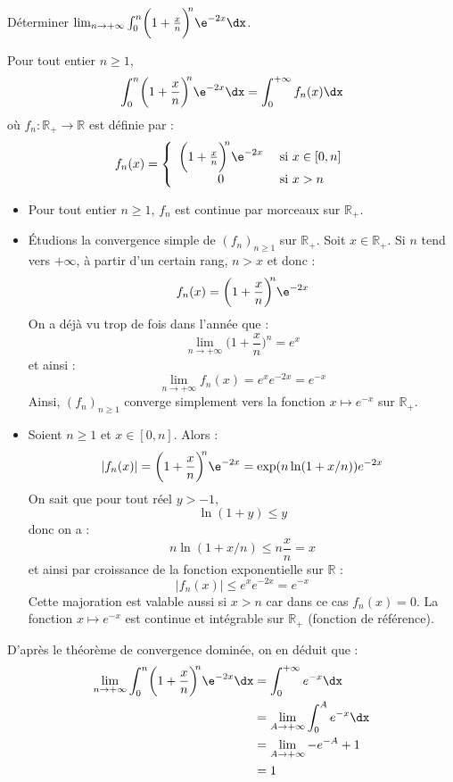 \documentclass[a4paper,10pt]{report}
\begin{document}
\begin{Exercice}{} Déterminer $\lim_{n \to + \infty} \int_{0}^{n} \biggl( 1 + \frac{x}{n} \biggr)^{\!\!n} \e^{ - 2x} \dx$.
\end{Exercice}

\corr Pour tout entier $n \geq 1$,
$$ \int_{0}^{n} \biggl( 1 + \frac{x}{n} \biggr)^{\!\!n} \e^{ - 2x} \dx = \int_0^{+ \infty} f_n(x) \dx$$
où $f_n : \mathbb{R}_+ \rightarrow  \mathbb{R}$ est définie par :
$$ f_n(x) = \left\lbrace \begin{array}{cl}
\biggl( 1 + \frac{x}{n} \biggr)^{\!\!n} \e^{ - 2x} & \hbox{ si } x \in [0,n] \\
0 & \hbox{ si } x>n
\end{array}\right.$$
\begin{itemize}
\item Pour tout entier $n \geq 1$, $f_n$ est continue par morceaux sur $\mathbb{R}_+$.
\item Étudions la convergence simple de $(f_n)_{n \geq 1}$ sur $\mathbb{R}_+$. Soit $x \in \mathbb{R}_+$. Si $n$ tend vers $+ \infty$, à partir d'un certain rang, $n>x$ et donc :
$$ f_n(x) = \biggl( 1 + \frac{x}{n} \biggr)^{\!\!n} \e^{ - 2x}$$
On a déjà vu trop de fois dans l'année que :
$$ \lim_{n \rightarrow + \infty} \biggl( 1 + \frac{x}{n} \biggr)^{\!\!n} = e^x$$
et ainsi :
$$ \lim_{n \rightarrow + \infty} f_n(x) =e^x e^{-2x} = e^{-x}$$
Ainsi, $(f_n)_{n \geq 1}$ converge simplement vers la fonction $x \mapsto e^{-x}$ sur $\mathbb{R}_+$.
\item Soient $n \geq 1$ et $x \in [0,n]$. Alors :
$$ \vert f_n(x) \vert = \biggl( 1 + \frac{x}{n} \biggr)^{\!\!n} \e^{ - 2x} = \exp(n \ln(1+x/n)) e^{-2x}$$
On sait que pour tout réel $y>-1$,
$$ \ln(1+y) \leq y$$
donc on a :
$$ n \ln(1+x/n) \leq n\dfrac{x}{n} = x$$
et ainsi par croissance de la fonction exponentielle sur $\mathbb{R}$ :
$$ \vert f_n(x) \vert  \leq e^{x} e^{-2x} = e^{-x}$$
Cette majoration est valable aussi si $x>n$ car dans ce cas $f_n(x)=0$. La fonction $x \mapsto e^{-x}$ est continue et intégrable sur $\mathbb{R}_+$ (fonction de référence).
\end{itemize}
D'après le théorème de convergence dominée, on en déduit que :
\begin{align*}
\lim_{n \to + \infty} \int_{0}^{n} \biggl( 1 + \frac{x}{n} \biggr)^{\!\!n} \e^{ - 2x} \dx & = \int_0^{+ \infty} e^{-x} \dx \\
& = \lim_{A \rightarrow + \infty} \int_0^A e^{-x} \dx \\
&  = \lim_{A \rightarrow + \infty} -e^{-A}+1 \\
& = 1
\end{align*}
\end{document}
